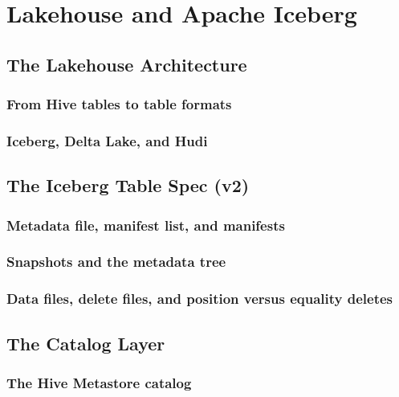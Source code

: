 \chapter{Lakehouse and Apache Iceberg}
\label{ch:iceberg}

\tbd


\section{The Lakehouse Architecture}
\label{sec:ice-lakehouse}

\subsection{From Hive tables to table formats}
\tbd

\subsection{Iceberg, Delta Lake, and Hudi}
\tbd

\section{The Iceberg Table Spec (v2)}
\label{sec:ice-spec}

\subsection{Metadata file, manifest list, and manifests}
\tbd

\subsection{Snapshots and the metadata tree}
\tbd

\subsection{Data files, delete files, and position versus equality deletes}
\tbd

\section{The Catalog Layer}
\label{sec:ice-catalog}

\subsection{The Hive Metastore catalog}
\tbd

